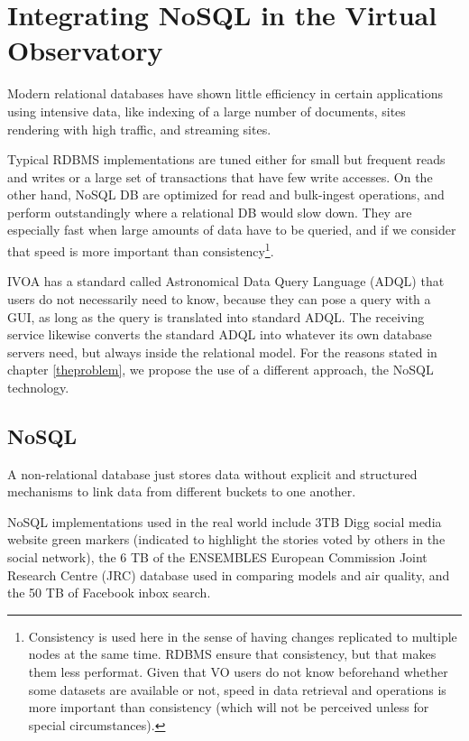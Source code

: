 \chapter{Integrating NoSQL in the Virtual Observatory}

Modern relational databases have shown little efficiency in certain applications using intensive data, like indexing of a large number of documents, sites rendering with high traffic, and streaming sites.

Typical RDBMS implementations are tuned either for small but frequent reads and writes or a large set of transactions that have few write accesses. On the other
hand,
NoSQL DB are optimized for read and
bulk-ingest
operations, and perform outstandingly where a relational DB would slow down. They are especially fast when large amounts of data have to be queried, and if we consider that speed is more important than
consistency\footnote{Consistency is used here in the sense of having changes replicated to multiple nodes at the same time. RDBMS ensure that consistency, but that makes them less performat. Given that VO users do not know beforehand whether some datasets are available or not, speed in data retrieval and operations is more important than consistency (which will not be perceived unless for special circumstances).}.

IVOA has a standard called Astronomical Data Query Language (ADQL) that users do not necessarily need to know, because
they %
can pose a query with a GUI, as long as the query is translated into standard ADQL. The receiving service likewise converts the standard ADQL into whatever its own database servers need, but always inside
the
relational model. For the reasons stated in chapter \ref{theproblem}, we propose the use of a different approach, the NoSQL technology.


\section{NoSQL}

A non-relational database just stores data without explicit and structured mechanisms to link data from different buckets to one another.

NoSQL implementations used in the real world include 3TB Digg
social media website
green markers (indicated to highlight the stories voted by others in the social network), the 6 TB of
the ENSEMBLES
European Commission
Joint Research Centre (JRC)
database used in comparing models and air quality, and the 50 TB of Facebook inbox search. 

